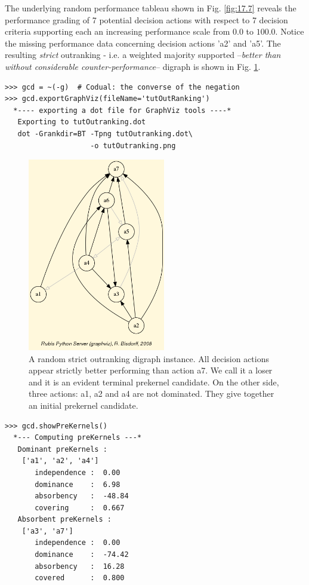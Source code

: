 The underlying random performance tableau shown in Fig. \ref{fig:17.7} reveals the performance grading of 7 potential decision actions with respect to 7 decision criteria supporting each an increasing performance scale from $0.0$ to $100.0$. Notice the missing performance data concerning decision actions 'a2' and 'a5'. The resulting \emph{strict} outranking - i.e. a weighted majority supported --\emph{better than without considerable counter-performance}-- digraph is shown in Fig. \ref{fig:17.8}.
\begin{lstlisting}
>>> gcd = ~(-g)  # Codual: the converse of the negation
>>> gcd.exportGraphViz(fileName='tutOutRanking')
  *---- exporting a dot file for GraphViz tools ----*
   Exporting to tutOutranking.dot
   dot -Grankdir=BT -Tpng tutOutranking.dot\
                    -o tutOutranking.png
\end{lstlisting}
\begin{figure}[h]
\sidecaption
\includegraphics[width=6cm]{Figures/tutOutranking.png}
\caption{A random strict outranking digraph instance. All decision actions appear strictly better performing than action a7. We call it a \Condorcet loser and it is an evident terminal prekernel candidate. On the other side, three actions: a1, a2 and a4 are not dominated. They give together an initial prekernel candidate.}
\label{fig:17.8}       %
\end{figure}
\begin{lstlisting}
>>> gcd.showPreKernels()
  *--- Computing preKernels ---*
   Dominant preKernels :
    ['a1', 'a2', 'a4']
       independence :  0.00
       dominance    :  6.98
       absorbency   :  -48.84
       covering     :  0.667
   Absorbent preKernels :
    ['a3', 'a7']
       independence :  0.00
       dominance    :  -74.42
       absorbency   :  16.28
       covered      :  0.800
\end{lstlisting}


